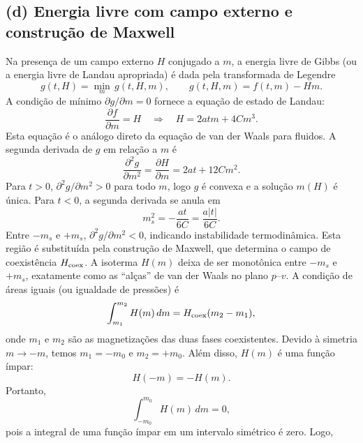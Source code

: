 \documentclass[11pt,a4paper]{article}
\begin{document}
\subsection*{(d) Energia livre com campo externo e construção de Maxwell}
%
Na presença de um campo externo $H$ conjugado a $m$, a energia livre de Gibbs (ou a energia livre de Landau apropriada) é dada pela transformada de Legendre
%
\begin{equation}
    g(t, H) = \min_{m} \, g(t, H, m), \qquad g(t, H, m) = f(t, m) - H m.
\end{equation}
%
A condição de mínimo $\partial g/\partial m = 0$ fornece a equação de estado de Landau:
%
\begin{equation}
    \frac{\partial f}{\partial m} = H \quad \Longrightarrow \quad H = 2a t m + 4 C m^3.
    \label{eq:landau_eos}
\end{equation}
%
Esta equação é o análogo direto da equação de van der Waals para fluidos. A segunda derivada de $g$ em relação a $m$ é
%
\begin{equation}
    \frac{\partial^2 g}{\partial m^2} = \frac{\partial H}{\partial m} = 2a t + 12 C m^2.
\end{equation}
%
Para $t > 0$, $\partial^2 g/\partial m^2 > 0$ para todo $m$, logo $g$ é convexa e a solução $m(H)$ é única.
%
Para $t < 0$, a segunda derivada se anula em
%
\begin{equation}
    m_s^2 = -\frac{a t}{6C} = \frac{a |t|}{6C}.
\end{equation}
%
Entre $-m_s$ e $+m_s$, $\partial^2 g/\partial m^2 < 0$, indicando instabilidade termodinâmica. Esta região é substituída pela construção de Maxwell, que determina o campo de coexistência $H_{\rm coex}$. A isoterma $H(m)$ deixa de ser monotônica entre $-m_s$ e $+m_s$, exatamente como as ``alças'' de van der Waals no plano $p$--$v$.
%
A condição de áreas iguais (ou igualdade de pressões) é
%
\begin{equation}
    \int_{m_1}^{m_2} H(m) \, dm = H_{\rm coex} (m_2 - m_1),
\end{equation}
%
onde $m_1$ e $m_2$ são as magnetizações das duas fases coexistentes. Devido à simetria $m \to -m$, temos $m_1 = -m_0$ e $m_2 = +m_0$. Além disso, $H(m)$ é uma função ímpar:
%
\begin{equation}
    H(-m) = -H(m).
\end{equation}
%
Portanto,
%
\begin{equation}
    \int_{-m_0}^{m_0} H(m) \, dm = 0,
\end{equation}
%
pois a integral de uma função ímpar em um intervalo simétrico é zero. Logo,
\end{document}
